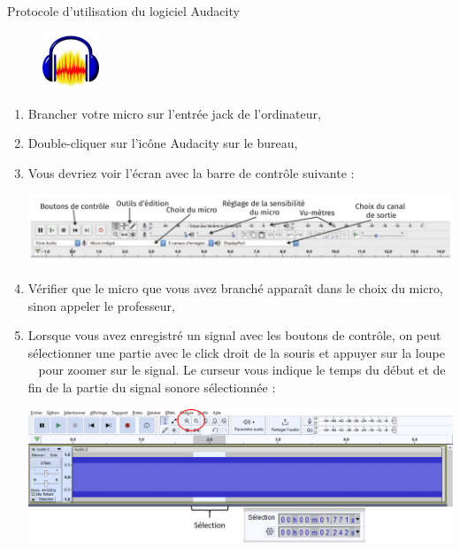 \begin{doc}{Protocole d'utilisation du logiciel Audacity}
\vspace{-1cm}
\begin{figure}
\vspace{-0.6cm}
    \centering
     \includegraphics[width=0.15\textwidth]{Images/Audacity.jpeg}
   \end{figure}
\begin{enumerate}
    \item Brancher votre micro sur l'entrée jack de l'ordinateur,
    \item Double-cliquer sur l'icône Audacity sur le bureau,
    \item Vous devriez voir l'écran avec la barre de contrôle suivante :
        \begin{center}
        \includegraphics[scale=0.6]{Images/Audacity.PNG}
        \end{center}
    \item Vérifier que le micro que vous avez branché apparaît dans le choix du micro, sinon appeler le professeur,
    \item Lorsque vous avez enregistré un signal avec les boutons de contrôle, on peut sélectionner une partie avec le click droit de la souris et appuyer sur la \og loupe \fg~ pour zoomer sur le signal. Le curseur vous indique le temps du début et de fin de la partie du signal sonore sélectionnée :
    \begin{center}
        \includegraphics[scale=0.5]{Images/Audacity_son.png}
    \end{center}
    
\end{enumerate}

\end{doc}
